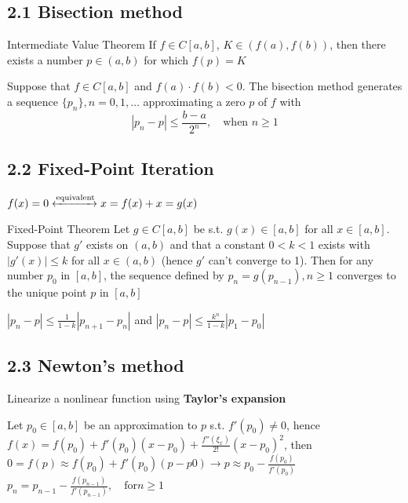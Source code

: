 \documentclass[11pt]{article}
\begin{document}
\subsection{2.1 Bisection method}
\label{sec:orga87bb52}
\begin{theorem}{Intermediate Value Theorem}
If $f\in C[a,b]$, $K\in(f(a), f(b))$, then there exists a number $p\in(a,b)$
for which $f(p)=K$
\end{theorem}

\begin{theorem}
Suppose that $f\in C[a,b]$ and $f(a)\cdot f(b)<0$. The bisection method
generates a sequence $\{p_n\},n=0,1,\dots$ approximating a zero $p$ of $f$ with
\begin{equation*}
|p_n-p|\le\frac{b-a}{2^n}, \quad\text{when } n\ge 1
\end{equation*}
\end{theorem}
\subsection{2.2 Fixed-Point Iteration}
\label{sec:orgf51239e}
\(f(x)=0\xleftrightarrow{\text{equivalent}} x=f(x)+x=g(x)\)

\begin{theorem}{Fixed-Point Theorem}
Let $g\in C[a,b]$ be s.t. $g(x)\in[a,b]$ for all $x\in[a,b]$. Suppose that
$g'$ exists on $(a,b)$ and that a constant $0<k<1$ exists with $|g'(x)|\le k$
for all $x\in(a,b)$ (hence $g'$ can't converge to 1). Then for any number
$p_0$ in $[a,b]$, the sequence defined by $p_n=g(p_{n-1}), n\ge 1$ converges
to the unique point $p$ in $[a,b]$
\end{theorem}

\begin{corollary}
$|p_n-p|\le\frac{1}{1-k}|p_{n+1}-p_n|$ and
$|p_n-p|\le\frac{k^n}{1-k}|p_1-p_0|$
\end{corollary}
\subsection{2.3 Newton's method}
\label{sec:orge17fa88}
Linearize a nonlinear function using \textbf{Taylor's expansion}

Let \(p_0\in [a,b]\) be an approximation to \(p\) s.t. \(f'(p_0)\neq 0\), hence 
\(f(x)=f(p_0)+f'(p_0)(x-p_0)+\frac{f''(\xi_x)}{2!}(x-p_0)^2\), then
\(0=f(p)\approx f(p_0)+f'(p_0)(p-p0)\rightarrow p\approx
   p_0-\frac{f(p_0)}{f'(p_0)}\)
\(p_n=p_{n-1}-\frac{f(p_{n-1})}{f'(p_{n-1})},\quad\text{for} n\ge 1\)
\end{document}
